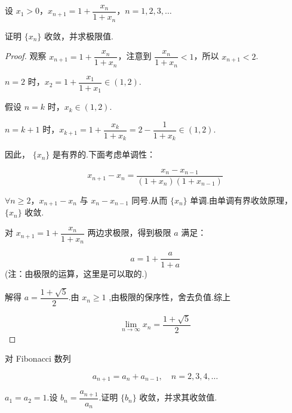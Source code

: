 \begin{example}
	设 $x_1 > 0$，$x_{n+1} = 1 + \dfrac{x_n}{1 + x_n}$，$n = 1, 2, 3, \dots$
	
	证明 $\{x_n\}$ 收敛，并求极限值.
\end{example}
\begin{proof}
	观察 $x_{n+1} = 1 + \dfrac{x_n}{1 + x_n}$，注意到 $\dfrac{x_n}{1 + x_n} < 1$，所以 $x_{n+1} < 2$.
	
	
	$n = 2$ 时，$x_2 = 1 + \dfrac{x_1}{1 + x_1} \in (1, 2)$.
	
	假设 $n = k$ 时，$x_k \in (1, 2)$.
	
	$n = k + 1$ 时，$x_{k+1} = 1 + \dfrac{x_k}{1 + x_k} = 2 - \dfrac{1}{1 + x_k} \in (1, 2)$.
	
	因此， $\{x_n\}$ 是有界的.下面考虑单调性：
	
	\[
	x_{n+1} - x_n = \dfrac{x_n - x_{n-1}}{(1 + x_n)(1 + x_{n-1})}
	\]
	
	$\forall n \geqslant 2$，$x_{n+1} - x_n$ 与 $x_n - x_{n-1}$ 同号.从而 $\{x_n\}$ 单调.由单调有界收敛原理，$\{x_n\}$ 收敛.
	
	对 $x_{n+1} = 1 + \dfrac{x_n}{1 + x_n}$ 两边求极限，得到极限 $a$ 满足：
	
	\[
	a = 1 + \frac{a}{1 + a}
	\]
	(注：由极限的运算，这里是可以取的.)
	
	解得 $a = \dfrac{1+\sqrt{5}}{2}$.由 $x_n \geqslant 1$ ,由极限的保序性，舍去负值.综上
	
	\[
	\lim_{n \to \infty} x_n = \frac{1+\sqrt{5}}{2}
	\]
\end{proof}
\begin{example}
	对 Fibonacci 数列
	
	\[
	a_{n+1} = a_n + a_{n-1}, \quad n = 2, 3, 4, \dots
	\]
	
	$a_1 = a_2 = 1$.设 $b_n = \dfrac{a_{n+1}}{a_n}$.证明 $\{b_n\}$ 收敛，并求其收敛值.
\end{example}
